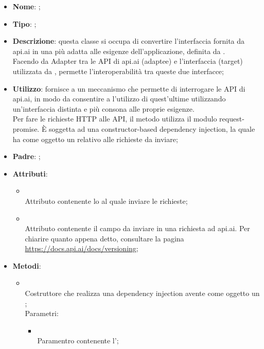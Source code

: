 \begin{itemize}
	\item \textbf{Nome}: ;
	\item \textbf{Tipo}: ;
	\item \textbf{Descrizione}: questa classe si occupa di convertire l'interfaccia fornita da api.ai in una più adatta alle esigenze dell'applicazione, definita da . \\
Facendo da Adapter tra le API di api.ai (adaptee) e l'interfaccia  (target) utilizzata da , permette l'interoperabilità tra queste due interfacce;
	\item \textbf{Utilizzo}: fornisce a  un meccanismo che permette di interrogare le API di api.ai, in modo da consentire a  l'utilizzo di quest'ultime utilizzando un'interfaccia distinta e più consona alle proprie esigenze. \\ Per fare le richieste HTTP alle API, il metodo  utilizza il modulo request-promise.
È soggetta ad una constructor-based dependency injection, la quale ha come oggetto un  relativo alle richieste da inviare;
	\item \textbf{Padre}: ;
	\item \textbf{Attributi}:
	\begin{itemize}
		\item[]  \\
		Attributo contenente lo  al quale inviare le richieste;
		\item[]  \\
		Attributo contenente il campo  da inviare in una richiesta ad api.ai. Per chiarire quanto appena detto, consultare la pagina \url{https://docs.api.ai/docs/versioning};
	\end{itemize}
	\item \textbf{Metodi}:
	\begin{itemize}
		\item[]  \\
		Costruttore che realizza una dependency injection avente come oggetto un ;\\
		Parametri:
		\begin{itemize}
			\item {} \\
			Paramentro contenente l';

\end{itemize}
\end{itemize}
\end{itemize}

